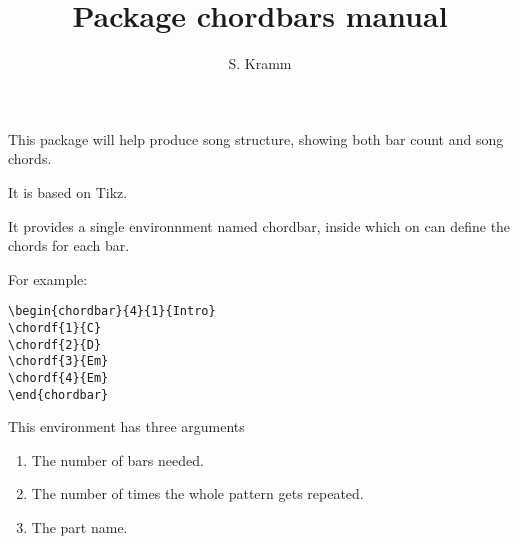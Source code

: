 \documentclass[11pt]{article}
\title{Package chordbars manual}
\author{S. Kramm}
\begin{document}
\maketitle

This package will help produce song structure, showing both bar count and song chords.

It is based on Tikz.

It provides a single environnment named {\ttfamily chordbar}, inside which on can define the chords for each bar.

For example:

\begin{lstlisting}
\begin{chordbar}{4}{1}{Intro}
\chordf{1}{C}
\chordf{2}{D}
\chordf{3}{Em}
\chordf{4}{Em}
\end{chordbar}
\end{lstlisting}

This environment has three arguments
\begin{enumerate}
\item The number of bars needed.
\item The number of times the whole pattern gets repeated.
\item The part name.
\end{enumerate}
\end{document}
